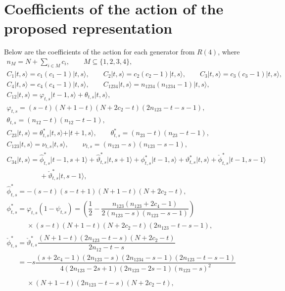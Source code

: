 \documentclass[pdftex]{sigma}
\numberwithin{equation}{section}
\begin{document}
\section{Coefficients of the action of the proposed representation}\label{AppCoeff}
Below are the coefficients of the action for each generator from $R(4)$, where
\begin{gather*}
n_M=N+\sum_{i\in M}c_i,\qquad M\subseteq\lbrace1,2,3,4\rbrace,
\\
C_1\vert t,s\rangle =c_1(c_1-1)\vert t,s\rangle,
\qquad
C_2\vert t,s\rangle =c_2(c_2-1)\vert t,s\rangle,
\qquad
C_3\vert t,s\rangle =c_3(c_3-1)\vert t,s\rangle,
\\
C_4\vert t,s\rangle =c_4(c_4-1)\vert t,s\rangle,
\qquad
C_{1234}\vert t,s\rangle =n_{1234}(n_{1234}-1)\vert t,s\rangle,
\\
C_{12}\vert t,s\rangle =\varphi_{t,s}\vert t-1,s\rangle+\theta_{t,s}\vert t,s\rangle,\\
\varphi_{t,s}=(s-t)(N+1-t)(N+2c_2-t)(2n_{123}-t-s-1),\\
\theta_{t,s}=(n_{12}-t)(n_{12}-t-1),
\\
C_{23}\vert t,s\rangle=\theta^*_{t,s}\vert t,s\rangle+\vert t+1,s\rangle,\qquad
\theta^*_{t,s}=(n_{23}-t)(n_{23}-t-1),
\\
C_{123}\vert t,s\rangle =\nu_{t,s}\vert t,s\rangle,\qquad
\nu_{t,s}=(n_{123}-s)(n_{123}-s-1),
\\
C_{34}\vert t,s\rangle =\hat{\phi}^*_{t,s}\vert t-1,s+1\rangle+\hat{\vartheta}^*_{t,s}\vert t,s+1\rangle
+\phi^*_{t,s}\vert t-1,s\rangle+\vartheta^*_{t,s}\vert t,s\rangle
+\check{\phi}^*_{t,s}\vert t-1,s-1\rangle\\
\phantom{C_{34}\vert t,s\rangle =}{}+\check{\vartheta}^*_{t,s}\vert t,s-1\rangle,\\
\hat{\phi}^*_{t,s}=-(s-t)(s-t+1)(N+1-t)(N+2c_2-t),\\
\phi^*_{t,s}=\varphi_{t,s}(1-\psi_{t,s})=\left(\dfrac{1}{2}-\dfrac{n_{123}(n_{123}+2c_4-1)}{2(n_{123}-s)(n_{123}-s-1)}\right)\\
\phantom{\phi^*_{t,s}=}{}\times(s-t)(N+1-t)(N+2c_2-t)(2n_{123}-t-s-1),\\
\check{\phi}^*_{t,s}=\check{\vartheta}_{t,s}^*\dfrac{(N+1-t)(2n_{123}-t-s)(N+2c_2-t)}{2n_{12}-t-s}\\
\phantom{\check{\phi}^*_{t,s}}{}=-s\dfrac{(s+2c_4-1)(2n_{123}-s)(2n_{1234}-s-1)(2n_{123}-t-s-1)}{4(2n_{123}-2s+1)(2n_{123}-2s-1)(n_{123}-s)^2}\\
\phantom{\check{\phi}^*_{t,s}=}{} \times(N+1-t)(2n_{123}-t-s)(N+2c_2-t),\\

\end{gather*}
\end{document}

